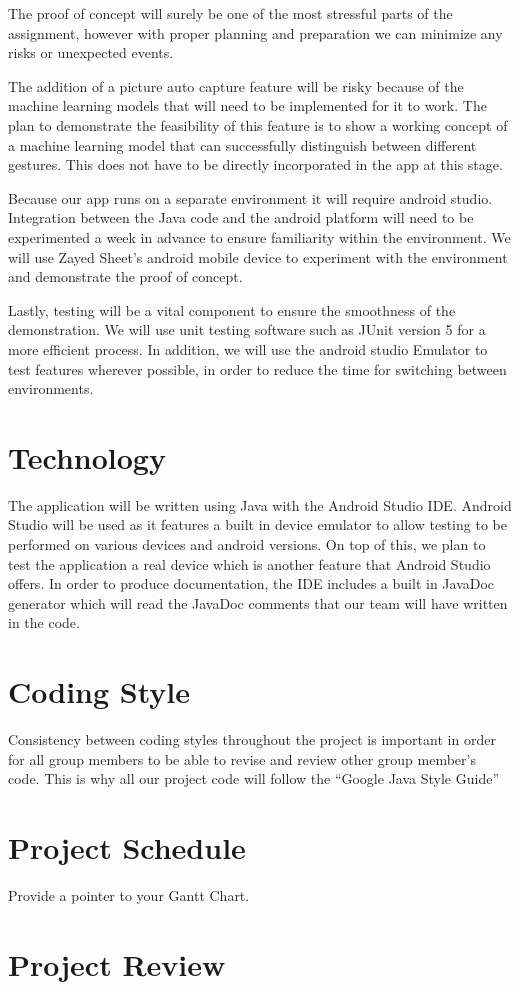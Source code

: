 \documentclass{article}
\begin{document}
The proof of concept will surely be one of the most stressful parts of the assignment, however with proper planning and preparation we can minimize any risks or unexpected events. 

The addition of a picture auto capture feature will be risky because of the machine learning models that will need to be implemented for it to work. The plan to demonstrate the feasibility of this feature is to show a working concept of a machine learning model that can successfully distinguish between different gestures. This does not have to be directly incorporated in the app at this stage.

Because our app runs on a separate environment it will require android studio. Integration between the Java code and the android platform will need to be experimented a week in advance to ensure familiarity within the environment. We will use Zayed Sheet’s android mobile device to experiment with the environment and demonstrate the proof of concept. 

Lastly, testing will be a vital component to ensure the smoothness of the demonstration. We will use unit testing software such as JUnit version 5 for a more efficient process. In addition, we will use the android studio Emulator to test features wherever possible, in order to reduce the time for switching between environments. 


\section{Technology}

The application will be written using Java with the Android Studio IDE. Android Studio will be used as it features a built in device emulator to allow testing to be performed on various devices and android versions. On top of this, we plan to test the application a real device which is another feature that Android Studio offers. In order to produce documentation, the IDE includes a built in JavaDoc generator which will read the JavaDoc comments that our team will have written in the code.

\section{Coding Style}

Consistency between coding styles throughout the project is important in order for all group members to be able to revise and review other group member’s code. This is why all our project code will follow the “Google Java Style Guide”

\section{Project Schedule}

Provide a pointer to your Gantt Chart.

\section{Project Review}
\end{document}
